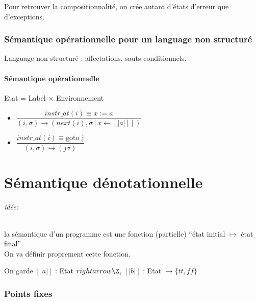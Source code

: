 \documentclass[10pt,a4paper]{article}
\newcommand{\sem}[1]{$\left[| #1 | \right]$}
\newcommand{\semm}[1]{\left[| #1 | \right]}
\begin{document}
Pour retrouver la compositionnalité, on crée autant d'états d'erreur que d'exceptions.

\section{Sémantique opérationnelle pour un language non structuré}
Language non structuré : affectations, sauts conditionnels.

\subsection{Sémantique opérationnelle}
Etat = Label $\times$ Environnement\\

\begin{itemize}
\item $\dfrac{instr\_at(i) \equiv x:=a }{(i, \sigma) \rightarrow (next(i), \sigma[x \leftarrow \semm{a}])}$\\
\item $\dfrac{instr\_at(i) \equiv \text{goto j} }{(i, \sigma) \rightarrow (j \sigma)}$
\end{itemize}

\part{Sémantique dénotationnelle}
\paragraph{idée:} la sémantique d'un programme est une fonction (partielle) ``état initial $\mapsto$ état final''\\
On va définir proprement cette fonction.

On garde \sem{a} : Etat $rightarrow \Z$, \sem{b} : Etat $\rightarrow \{tt, ff \}$


\section{Points fixes}
\end{document}
